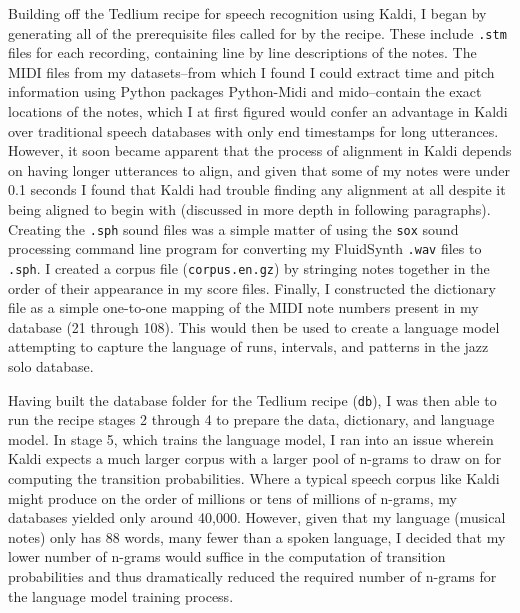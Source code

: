 \documentclass[conference]{IEEEtran}
\begin{document}
Building off the Tedlium recipe for speech recognition using Kaldi, I began by generating all of the prerequisite files called for by the recipe. These include \texttt{.stm} files for each recording, containing line by line descriptions of the notes. The MIDI files from my datasets--from which I found I could extract time and pitch information using Python packages Python-Midi and mido--contain the exact locations of the notes, which I at first figured would confer an advantage in Kaldi over traditional speech databases with only end timestamps for long utterances. However, it soon became apparent that the process of alignment in Kaldi depends on having longer utterances to align, and given that some of my notes were under 0.1 seconds I found that Kaldi had trouble finding any alignment at all despite it being aligned to begin with (discussed in more depth in following paragraphs). Creating the \texttt{.sph} sound files was a simple matter of using the \texttt{sox} sound processing command line program for converting my FluidSynth \texttt{.wav} files to \texttt{.sph}. I created a corpus file (\texttt{corpus.en.gz}) by stringing notes together in the order of their appearance in my score files. Finally, I constructed the dictionary file as a simple one-to-one mapping of the MIDI note numbers present in my database (21 through 108). This would then be used to create a language model attempting to capture the language of runs, intervals, and patterns in the jazz solo database.

Having built the database folder for the Tedlium recipe (\texttt{db}), I was then able to run the recipe stages 2 through 4 to prepare the data, dictionary, and language model. In stage 5, which trains the language model, I ran into an issue wherein Kaldi expects a much larger corpus with a larger pool of n-grams to draw on for computing the transition probabilities. Where a typical speech corpus like Kaldi might produce on the order of millions or tens of millions of n-grams, my databases yielded only around 40,000. However, given that my language (musical notes) only has 88 words, many fewer than a spoken language, I decided that my lower number of n-grams would suffice in the computation of transition probabilities and thus dramatically reduced the required number of n-grams for the language model training process.
\end{document}
